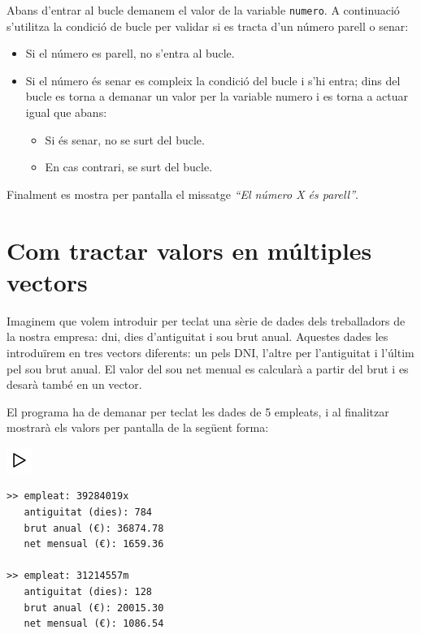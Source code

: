 \documentclass[
]{book}
\providecommand{\tightlist}{%
  \setlength{\itemsep}{0pt}\setlength{\parskip}{0pt}}
\begin{document}
Abans d'entrar al bucle demanem el valor de la variable \texttt{numero}. A continuació s'utilitza la condició de bucle per validar si es tracta d'un número parell o senar:

\begin{itemize}
\tightlist
\item
  Si el número es parell, no s'entra al bucle.
\item
  Si el número és senar es compleix la condició del bucle i s'hi entra; dins del bucle es torna a demanar un valor per la variable numero i es torna a actuar igual que abans:

  \begin{itemize}
  \tightlist
  \item
    Si és senar, no se surt del bucle.
  \item
    En cas contrari, se surt del bucle.
  \end{itemize}
\end{itemize}

Finalment es mostra per pantalla el missatge \emph{``El número X és parell''}.

\hypertarget{com-tractar-valors-en-muxfaltiples-vectors}{%
\section{Com tractar valors en múltiples vectors}\label{com-tractar-valors-en-muxfaltiples-vectors}}

Imaginem que volem introduir per teclat una sèrie de dades dels treballadors de la nostra empresa: dni, dies d'antiguitat i sou brut anual. Aquestes dades les introduïrem en tres vectors diferents: un pels DNI, l'altre per l'antiguitat i l'últim pel sou brut anual. El valor del sou net menual es calcularà a partir del brut i es desarà també en un vector.

El programa ha de demanar per teclat les dades de 5 empleats, i al finalitzar mostrarà els valors per pantalla de la següent forma:

\includegraphics{./img/play.png}

\begin{verbatim}
>> empleat: 39284019x
   antiguitat (dies): 784
   brut anual (€): 36874.78
   net mensual (€): 1659.36

>> empleat: 31214557m
   antiguitat (dies): 128
   brut anual (€): 20015.30
   net mensual (€): 1086.54
\end{verbatim}
\end{document}
